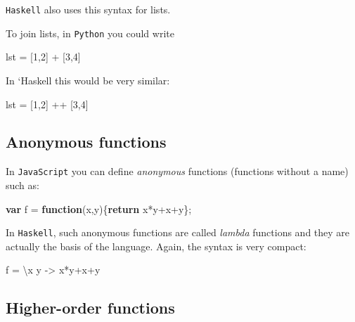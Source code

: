 \documentclass[11pt]{amsart}
\newenvironment{Shaded}{}{}
\newcommand{\KeywordTok}[1]{\textcolor[rgb]{0.00,0.44,0.13}{\textbf{{#1}}}}
\newcommand{\DecValTok}[1]{\textcolor[rgb]{0.25,0.63,0.44}{{#1}}}
\newcommand{\OtherTok}[1]{\textcolor[rgb]{0.00,0.44,0.13}{{#1}}}
\newcommand{\FunctionTok}[1]{\textcolor[rgb]{0.02,0.16,0.49}{{#1}}}
\newcommand{\NormalTok}[1]{{#1}}
\begin{document}
\texttt{Haskell} also uses this syntax for lists.

To join lists, in \texttt{Python} you could write

\begin{Shaded}
\begin{Highlighting}[]
    \NormalTok{lst = [}\DecValTok{1}\NormalTok{,}\DecValTok{2}\NormalTok{] + [}\DecValTok{3}\NormalTok{,}\DecValTok{4}\NormalTok{]}
\end{Highlighting}
\end{Shaded}

In `Haskell this would be very similar:

\begin{Shaded}
\begin{Highlighting}[]
    \NormalTok{lst }\FunctionTok{=} \NormalTok{[}\DecValTok{1}\NormalTok{,}\DecValTok{2}\NormalTok{] }\FunctionTok{++} \NormalTok{[}\DecValTok{3}\NormalTok{,}\DecValTok{4}\NormalTok{]}
\end{Highlighting}
\end{Shaded}

\subsection{Anonymous functions}\label{anonymous-functions}

In \texttt{JavaScript} you can define \emph{anonymous} functions
(functions without a name) such as:

\begin{Shaded}
\begin{Highlighting}[]
    \KeywordTok{var} \NormalTok{f = }\KeywordTok{function}\NormalTok{(x,y)\{}\KeywordTok{return} \NormalTok{x*y+x+y\};}
\end{Highlighting}
\end{Shaded}

In \texttt{Haskell}, such anonymous functions are called \emph{lambda}
functions and they are actually the basis of the language. Again, the
syntax is very compact:

\begin{Shaded}
\begin{Highlighting}[]
    \NormalTok{f }\FunctionTok{=} \NormalTok{\textbackslash{}x y }\OtherTok{->} \NormalTok{x}\FunctionTok{*}\NormalTok{y}\FunctionTok{+}\NormalTok{x}\FunctionTok{+}\NormalTok{y}
\end{Highlighting}
\end{Shaded}

\subsection{Higher-order functions}\label{higher-order-functions}
\end{document}
